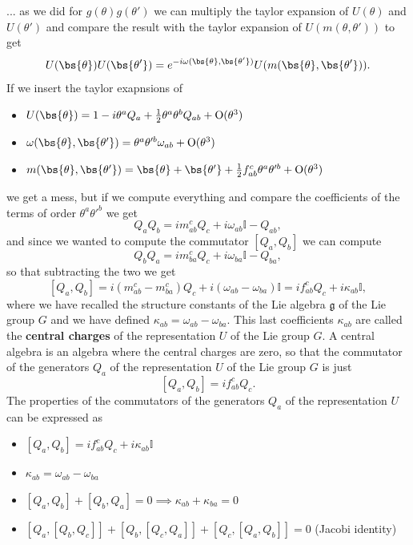...
as we did for \(g(\theta)g(\theta')\) we can multiply the taylor expansion of \(U(\theta)\) and \(U(\theta')\) and compare the result with the taylor expansion of \(U(m(\theta, \theta'))\) to get
\[
    U(\bs{\theta}) U(\bs{\theta'}) = e^{-i \omega(\bs{\theta}, \bs{\theta'})} U(m(\bs{\theta}, \bs{\theta'})).
\]
If we insert the taylor exapnsions of
\begin{itemize}
    \item \(U(\bs{\theta}) = 1 - i \theta^a Q_a + \frac{1}{2} \theta^a \theta^b Q_{ab} + \mathrm{O}(\theta^3)\)
    \item \(\omega(\bs{\theta}, \bs{\theta'}) = \theta^a \theta'^b \omega_{ab} + \mathrm{O}(\theta^3)\)
    \item \(m(\bs{\theta}, \bs{\theta'}) = \bs{\theta} + \bs{\theta'} + \frac{1}{2} f_{ab}^c \theta^a \theta'^b + \mathrm{O}(\theta^3)\)
\end{itemize}
we get a mess, but if we compute everything and compare the coefficients of the terms of order \(\theta^a \theta'^b\) we get
\[
    Q_a Q_b = i m^c_{ab} Q_c + i \omega_{ab}\mathbb{I} - Q_{ab},
\]
and since we wanted to compute the commutator \(\left[ Q_a, Q_b \right]\) we can compute
\[
    Q_b Q_a = i m^c_{ba} Q_c + i \omega_{ba}\mathbb{I} - Q_{ba},
\]
so that subtracting the two we get
\[
    \left[ Q_a, Q_b \right] = i (m^c_{ab} - m^c_{ba}) Q_c + i (\omega_{ab} - \omega_{ba})\mathbb{I} = i f^c_{ab} Q_c + i \kappa_{ab} \mathbb{I},
\]
where we have recalled the structure constants of the Lie algebra \(\mathfrak{g}\) of the Lie group \(G\) and we have defined \(\kappa_{ab} = \omega_{ab} - \omega_{ba}\). This last coefficients \(\kappa_{ab}\) are called the \textbf{central charges} of the representation \(U\) of the Lie group \(G\). A central algebra is an algebra where the central charges are zero, so that the commutator of the generators \(Q_a\) of the representation \(U\) of the Lie group \(G\) is just
\[
    \left[ Q_a, Q_b \right] = i f^c_{ab} Q_c.
\]
The properties of the commutators of the generators \(Q_a\) of the representation \(U\) can be expressed as
\begin{itemize}
    \item \(\left[ Q_a, Q_b \right] = i f^c_{ab} Q_c + i \kappa_{ab} \mathbb{I}\)
    \item \(\kappa_{ab} = \omega_{ab} - \omega_{ba}\)
    \item \([Q_a,Q_b] + [Q_b,Q_a]=0 \implies \kappa_{ab}+ \kappa_{ba}=0\)
    \item \([Q_a,[Q_b,Q_c]] + [Q_b,[Q_c,Q_a]] + [Q_c,[Q_a,Q_b]]=0\) (Jacobi identity)
\end{itemize}


